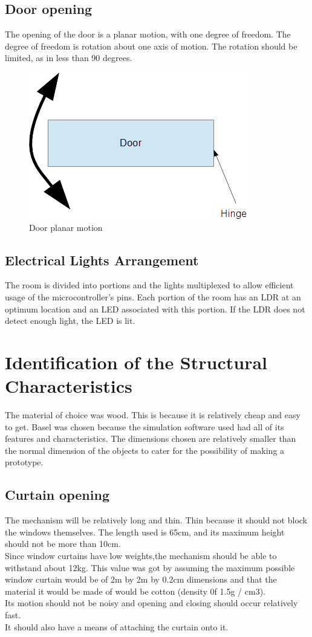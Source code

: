\documentclass[oneside,notitlepage]{book}
\begin{document}
\subsection{Door opening}
The opening of the door is a planar motion, with one degree of freedom. The degree of freedom is rotation about one axis of motion. The rotation should be limited, as in less than 90 degrees.
\begin{figure}[h!tb]
\includegraphics{dooranalysis.png}
\caption{Door planar motion}
\end{figure}

\subsection{Electrical Lights Arrangement}
The room is divided into portions and the lights multiplexed to allow efficient usage of the microcontroller's pins. Each portion of the room has an LDR at an optimum location and an LED associated with this portion. If the LDR does not detect enough light, the LED is lit. 

\section{Identification of the Structural Characteristics}
The material of choice was wood. This is because it is relatively cheap and easy to get. Basel was chosen because the simulation software used had all of its features and characteristics. The dimensions chosen are relatively smaller than the normal dimension of the objects to cater for the possibility of making a prototype.
\subsection{Curtain opening}
The mechanism will be relatively long and thin. Thin because it should not block the windows themselves. The length used is 65cm, and its maximum height should not be more than 10cm.
\\
Since window curtains have low weights,the mechanism should be able to withstand about 12kg. This value was got by assuming the maximum possible window curtain would be of 2m by 2m by 0.2cm dimensions and that the material it would be made of would be cotton (density 0f 1.5g / cm3).
\\
Its motion should not be noisy and opening and closing should occur relatively fast.\\
It should also have a means of attaching the curtain onto it.
\end{document}
